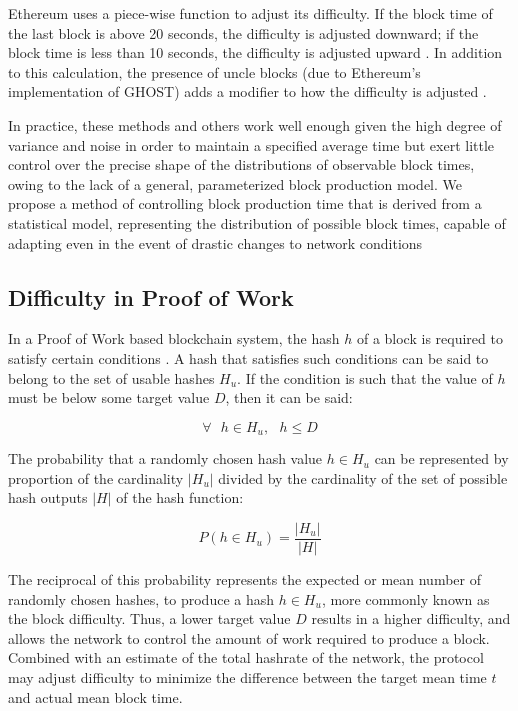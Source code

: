 \documentclass[]{article}
\begin{document}
Ethereum uses a piece-wise function to adjust its difficulty.  If the block time of the last block is above 20 seconds, the difficulty is adjusted downward; if the block time is less than 10 seconds, the difficulty is adjusted upward \cite{EthereumDifficulty}.  In addition to this calculation, the presence of uncle blocks (due to Ethereum's implementation of GHOST) adds a modifier to how the difficulty is adjusted \cite{EthereumUncles}.
\newline

In practice, these methods and others work well enough given the high degree of variance and noise in order to maintain a specified average time but exert little control over the precise shape of the distributions of observable block times, owing to the lack of a general, parameterized block production model.  We propose a method of controlling block production time that is derived from a statistical model, representing the distribution of possible block times, capable of adapting even in the event of drastic changes to network conditions

\subsection{Difficulty in Proof of Work}
In a Proof of Work based blockchain system, the hash $h$ of a block is required to satisfy certain conditions \cite{BitcoinWhitepaper}.  A hash that satisfies such conditions can be said to belong to the set of usable hashes $H_u$.  If the condition is such that the value of $h$ must be below some target value $D$, then it can be said:

\begin{equation}
\forall \text{ } h \in H_u, \text{ } h \le D
\end{equation}

The probability that a randomly chosen hash value $h \in H_u$ can be represented by proportion of the cardinality $|H_u|$ divided by the cardinality of the set of possible hash outputs $|H|$ of the hash function: 

\begin{equation}
	P(h \in H_u) = \frac{|H_u|}{|H|} 
\end{equation}

The reciprocal of this probability represents the expected or mean number of randomly chosen hashes, to produce a hash $h \in H_u$, more commonly known as the block difficulty.  Thus, a lower target value $D$ results in a higher difficulty, and allows the network to control the amount of work required to produce a block.  Combined with an estimate of the total hashrate of the network, the protocol may adjust difficulty to minimize the difference between the target mean time $t$ and actual mean block time.  
\end{document}
